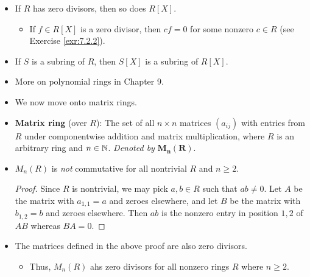 \documentclass[../notes.tex]{subfiles}
\begin{document}
\begin{itemize}
\begin{proposition}
\begin{enumerate}
\begin{proof}
\begin{equation*}
                    \deg p(X)+\deg q(X) = \deg p(X)q(X) = 0
                    \quad\Longleftrightarrow\quad
                    \deg p(X)=\deg q(X) = 0
                \end{equation*}
                Therefore, $p(X),q(X)\in R$ and hence are units of $R$, as desired.
            \end{proof}
            \item $R[X]$ is an integral domain.
            \begin{proof}
                We have already established that the commutativity and identity of $R[X]$ follow from $R$. As to no zero divisors, this constraint follows from part (1).
            \end{proof}
        \end{enumerate}
    \end{proposition}
    \item If $R$ has zero divisors, then so does $R[X]$.
    \begin{itemize}
        \item If $f\in R[X]$ is a zero divisor, then $cf=0$ for some nonzero $c\in R$ (see Exercise \ref{exr:7.2.2}).
    \end{itemize}
    \item If $S$ is a subring of $R$, then $S[X]$ is a subring of $R[X]$.
    \item More on polynomial rings in Chapter 9.
    \item {}We now move onto matrix rings.
    \item \textbf{Matrix ring} (over $R$): The set of all $n\times n$ matrices $(a_{ij})$ with entries from $R$ under componentwise addition and matrix multiplication, where $R$ is an arbitrary ring and $n\in\mathbb{N}$. \emph{Denoted by} $\bm{M_n(R)}$.
    \item $M_n(R)$ is \emph{not} commutative for all nontrivial $R$ and $n\geq 2$.
    \begin{proof}
        Since $R$ is nontrivial, we may pick $a,b\in R$ such that $ab\neq 0$. Let $A$ be the matrix with $a_{1,1}=a$ and zeroes elsewhere, and let $B$ be the matrix with $b_{1,2}=b$ and zeroes elsewhere. Then $ab$ is the nonzero entry in position $1,2$ of $AB$ whereas $BA=0$.
    \end{proof}
    \item The matrices defined in the above proof are also zero divisors.
    \begin{itemize}
        \item Thus, $M_n(R)$ ahs zero divisors for all nonzero rings $R$ where $n\geq 2$.

\end{itemize}
\end{itemize}
\end{document}
